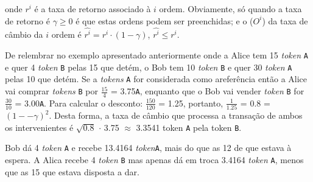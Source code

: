 \documentclass[UTF8,nofonts]{article}
\begin{document}
\begin{multicols}{2}
\begin{enumerate}

onde $r^i$ é a taxa de retorno associado à $i$ ordem. Obviamente, só quando a taxa de retorno é $\gamma \ge 0$ é que estas ordens podem ser preenchidas; e o ($O^i$) da taxa de câmbio da $i$ ordem é $\hat{r^i} = r^i \cdot (1-\gamma)$, $\hat{r^i}\le r^i$.


De relembrar no exemplo apresentado anteriormente onde a Alice tem 15 \textit{token} \verb|A| e quer 4 \textit{token} \verb|B| pelas 15 que detém, o Bob tem 10 \textit{token} \verb|B| e quer 30 \textit{token} \verb|A| pelas 10 que detém. Se a \textit{tokens} \verb|A| for considerada como areferência então a Alice vai comprar \textit{tokens} \verb|B| por $\frac{15}{4}$ = 3.75\verb|A|, enquanto que o Bob vai vender \textit{token} \verb|B| for $\frac{30}{10}$ = 3.00\verb|A|. Para calcular o desconto: $\frac{150}{120}$ = 1.25, portanto, $\frac{1}{1.25}$ = 0.8 = $(1 −- \gamma)^2$. Desta forma, a taxa de câmbio que processa a transação de ambos os intervenientes é $\sqrt{0.8}$ $\cdot$ 3.75 $\approx$ 3.3541 token \verb|A| pela token \verb|B|.


Bob dá 4 \textit{token} \verb|A| e recebe 13.4164 \textit{token}\verb|A|, mais do que as 12 de que estava à espera. A Alica recebe 4 \textit{token} \verb|B| mas apenas dá em troca 3.4164 \textit{token} \verb|A|, menos que as 15 que estava disposta a dar.


\end{enumerate}
\end{multicols}
\end{document}
